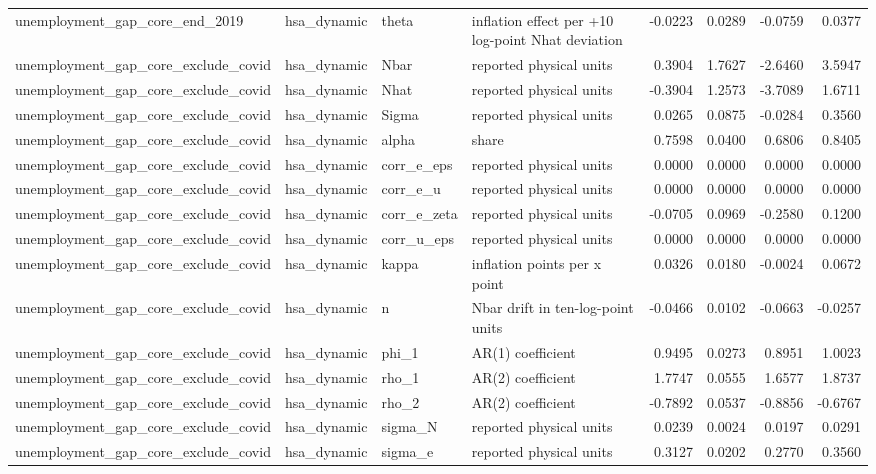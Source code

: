 \begin{tabular}{llllrrrr}
unemployment\_gap\_core\_end\_2019 & hsa\_dynamic & theta & inflation effect per +10 log-point Nhat deviation & -0.0223 & 0.0289 & -0.0759 & 0.0377 \\
unemployment\_gap\_core\_exclude\_covid & hsa\_dynamic & Nbar & reported physical units & 0.3904 & 1.7627 & -2.6460 & 3.5947 \\
unemployment\_gap\_core\_exclude\_covid & hsa\_dynamic & Nhat & reported physical units & -0.3904 & 1.2573 & -3.7089 & 1.6711 \\
unemployment\_gap\_core\_exclude\_covid & hsa\_dynamic & Sigma & reported physical units & 0.0265 & 0.0875 & -0.0284 & 0.3560 \\
unemployment\_gap\_core\_exclude\_covid & hsa\_dynamic & alpha & share & 0.7598 & 0.0400 & 0.6806 & 0.8405 \\
unemployment\_gap\_core\_exclude\_covid & hsa\_dynamic & corr\_e\_eps & reported physical units & 0.0000 & 0.0000 & 0.0000 & 0.0000 \\
unemployment\_gap\_core\_exclude\_covid & hsa\_dynamic & corr\_e\_u & reported physical units & 0.0000 & 0.0000 & 0.0000 & 0.0000 \\
unemployment\_gap\_core\_exclude\_covid & hsa\_dynamic & corr\_e\_zeta & reported physical units & -0.0705 & 0.0969 & -0.2580 & 0.1200 \\
unemployment\_gap\_core\_exclude\_covid & hsa\_dynamic & corr\_u\_eps & reported physical units & 0.0000 & 0.0000 & 0.0000 & 0.0000 \\
unemployment\_gap\_core\_exclude\_covid & hsa\_dynamic & kappa & inflation points per x point & 0.0326 & 0.0180 & -0.0024 & 0.0672 \\
unemployment\_gap\_core\_exclude\_covid & hsa\_dynamic & n & Nbar drift in ten-log-point units & -0.0466 & 0.0102 & -0.0663 & -0.0257 \\
unemployment\_gap\_core\_exclude\_covid & hsa\_dynamic & phi\_1 & AR(1) coefficient & 0.9495 & 0.0273 & 0.8951 & 1.0023 \\
unemployment\_gap\_core\_exclude\_covid & hsa\_dynamic & rho\_1 & AR(2) coefficient & 1.7747 & 0.0555 & 1.6577 & 1.8737 \\
unemployment\_gap\_core\_exclude\_covid & hsa\_dynamic & rho\_2 & AR(2) coefficient & -0.7892 & 0.0537 & -0.8856 & -0.6767 \\
unemployment\_gap\_core\_exclude\_covid & hsa\_dynamic & sigma\_N & reported physical units & 0.0239 & 0.0024 & 0.0197 & 0.0291 \\
unemployment\_gap\_core\_exclude\_covid & hsa\_dynamic & sigma\_e & reported physical units & 0.3127 & 0.0202 & 0.2770 & 0.3560 \\

\end{tabular}
